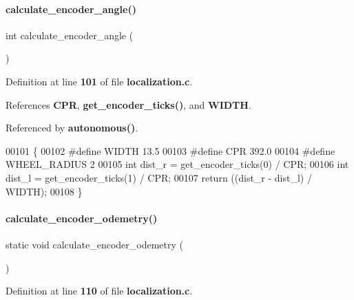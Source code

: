 \mbox{\label{a00119_a5dd17937f5561711cd12cdefa8d31869}} 
\paragraph{calculate\+\_\+encoder\+\_\+angle()}
{\footnotesize\ttfamily int calculate\+\_\+encoder\+\_\+angle (\begin{DoxyParamCaption}{ }\end{DoxyParamCaption})}



Definition at line \textbf{ 101} of file \textbf{ localization.\+c}.



References \textbf{ C\+PR}, \textbf{ get\+\_\+encoder\+\_\+ticks()}, and \textbf{ W\+I\+D\+TH}.



Referenced by \textbf{ autonomous()}.


\begin{DoxyCode}
00101                               \{
00102 \textcolor{preprocessor}{#define WIDTH 13.5}
00103 \textcolor{preprocessor}{#define CPR 392.0}
00104 \textcolor{preprocessor}{#define WHEEL\_RADIUS 2}
00105   \textcolor{keywordtype}{int} dist\_r = get_encoder_ticks(0) / CPR;
00106   \textcolor{keywordtype}{int} dist\_l = get_encoder_ticks(1) / CPR;
00107   \textcolor{keywordflow}{return} ((dist\_r - dist\_l) / WIDTH);
00108 \}
\end{DoxyCode}
\mbox{\label{a00119_a1cb0c9fa1e6ff2079deb836569d75d87}} 
\paragraph{calculate\+\_\+encoder\+\_\+odemetry()}
{\footnotesize\ttfamily static void calculate\+\_\+encoder\+\_\+odemetry (\begin{DoxyParamCaption}{ }\end{DoxyParamCaption})\hspace{0.3cm}{\ttfamily [static]}}



Definition at line \textbf{ 110} of file \textbf{ localization.\+c}.



